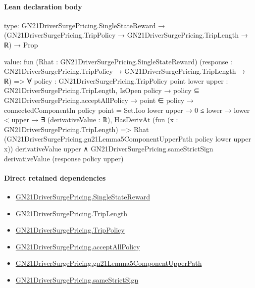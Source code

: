 \documentclass[10pt]{article}
\begin{document}
\paragraph{Lean declaration body}
\begin{ReviewVerbatim}
type:
GN21DriverSurgePricing.SingleStateReward →
  (GN21DriverSurgePricing.TripPolicy → GN21DriverSurgePricing.TripLength → ℝ) → Prop

value:
fun (Rhat : GN21DriverSurgePricing.SingleStateReward)
    (response : GN21DriverSurgePricing.TripPolicy → GN21DriverSurgePricing.TripLength → ℝ) =>
  ∀ {policy : GN21DriverSurgePricing.TripPolicy} {point lower upper : GN21DriverSurgePricing.TripLength},
    IsOpen policy →
      policy ⊆ GN21DriverSurgePricing.acceptAllPolicy →
        point ∈ policy →
          connectedComponentIn policy point = Set.Ioo lower upper →
            0 ≤ lower →
              lower < upper →
                ∃ (derivativeValue : ℝ),
                  HasDerivAt
                      (fun (x : GN21DriverSurgePricing.TripLength) =>
                        Rhat (GN21DriverSurgePricing.gn21Lemma5ComponentUpperPath policy lower upper x))
                      derivativeValue upper ∧
                    GN21DriverSurgePricing.sameStrictSign derivativeValue (response policy upper)
\end{ReviewVerbatim}

\paragraph{Direct retained dependencies}
\begin{itemize}\raggedright
\item \hyperlink{governing-declaration-f7708ce48623a5e0}{GN21\allowbreak{}Driver\allowbreak{}Surge\allowbreak{}Pricing.\allowbreak{}Single\allowbreak{}State\allowbreak{}Reward}
\item \hyperlink{governing-declaration-a616c143f22cf2bc}{GN21\allowbreak{}Driver\allowbreak{}Surge\allowbreak{}Pricing.\allowbreak{}Trip\allowbreak{}Length}
\item \hyperlink{governing-declaration-4312ad4cb899871f}{GN21\allowbreak{}Driver\allowbreak{}Surge\allowbreak{}Pricing.\allowbreak{}Trip\allowbreak{}Policy}
\item \hyperlink{governing-declaration-e94c9281d4f4b12d}{GN21\allowbreak{}Driver\allowbreak{}Surge\allowbreak{}Pricing.\allowbreak{}accept\allowbreak{}All\allowbreak{}Policy}
\item \hyperlink{governing-declaration-940afcd63c606407}{GN21\allowbreak{}Driver\allowbreak{}Surge\allowbreak{}Pricing.\allowbreak{}gn21\allowbreak{}Lemma5\allowbreak{}Component\allowbreak{}Upper\allowbreak{}Path}
\item \hyperlink{governing-declaration-867d0251c5f9e2dc}{GN21\allowbreak{}Driver\allowbreak{}Surge\allowbreak{}Pricing.\allowbreak{}same\allowbreak{}Strict\allowbreak{}Sign}
\end{itemize}
\hypertarget{governing-declaration-e25dd4d5b0ba5f64}{}
\end{document}

